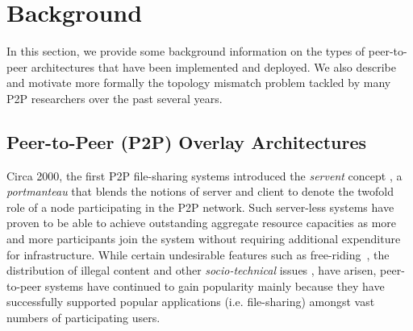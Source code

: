 \section{Background}
\label{section:background}


In this section, we provide some background information on the types of
peer-to-peer architectures that have been implemented and deployed. We also
describe and motivate more formally the topology mismatch problem tackled by
many P2P researchers over the past several years.

\subsection{Peer-to-Peer (P2P) Overlay Architectures}
Circa 2000, the first P2P file-sharing systems introduced the \emph{servent}
concept \cite{gnutella}, a \emph{portmanteau} that blends the notions of server
and client to denote the twofold role of a node participating in the P2P
network. Such server-less systems have proven to be able to achieve outstanding
aggregate resource capacities as more and more participants join the system
without requiring additional expenditure for infrastructure. While certain
undesirable features such as 
free-riding~\cite{saroiu_measurefileshare_2002,adar_gnutellafreeriders_2000,hughes_gnutellafreeride_2005},
the distribution of illegal content and other \emph{socio-technical}
issues \cite{hughes_socp2p_2008}, have arisen, peer-to-peer systems have
continued to gain popularity mainly because they have successfully supported
popular applications (i.e. file-sharing) amongst vast numbers of participating
users.

